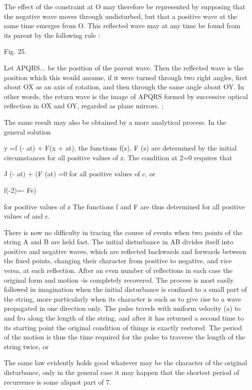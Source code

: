 The effect of the constraint at O may therefore be represented by
supposing that the negative wave moves through undisturbed, but that a
positive wave at the same time emerges from O. This reflected wave may
at any time be found from its parent by the following rule :

Fig. 25.

Let APQRS... be the position of the parent wave. Then the reflected wave
is the position which this would assume, if it were
turned through two right angles, first about OX as an axis of rotation,
and then through the same angle about OY. In other words, the return
wave is the image of APQRS formed by successive optical reflection in OX
and OY, regarded as plane mirrors. ;

The same result may also be obtained by a more analytical process. In
the general solution

y =f (- at) + F(x + at), the functions f(z), F (z) are determined by the
initial circumstances for all positive values of z. The condition at 2=0
requires that

J (- at) + (F (at) =0 for all positive values of c, or

f(-2)=- Fe)

for positive values of z The functions f and F are thus determined for
all positive values of and c.

There is now no difficulty in tracing the course of events when two
points of the string A and B are held fast. The initial disturbance in
AB divides itself into positive and negative waves, which are reflected
backwards and forwards between the fixed points, changing their
character from positive to negative, and vice versa, at each reflection.
After an even number of reflections in each case the original form and
motion -is completely recovered. The process is most easily followed in
imagination when the initial disturbance is confined to a small part of
the string, more particularly when its character is such as to give rise
to a wave propagated in one direction only. The pulse travels with
uniform velocity (a) to and fro along the length of the string, and
after it has returned a second time to its starting point the original
condition of things is exactly restored. The period of the motion is
thus the time required for the pulse to traverse the length of the
string twice, or

The same law evidently holds good whatever may be the character of the
original disturbance, only in the general case it may happen that the
shortest period of recurrence is some aliquot part of 7.

